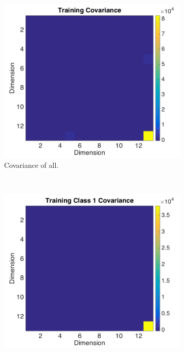 \documentclass[a4paper, 10pt, conference]{ieeeconf}
\begin{document}
\begin{figure}[!ht]
  \captionsetup[subfigure]{position=b}
  \centering
    \begin{subfigure}{0.5\textwidth}
      \includegraphics[width=\textwidth]{pic/covtraining.png}
      \caption{Covariance of all.}
      \label{fig:covtraining}
    \end{subfigure}
    ~
    \begin{subfigure}{0.5\textwidth}
      \includegraphics[width=\textwidth]{pic/covclass1.png}

\end{subfigure}
\end{figure}
\end{document}

